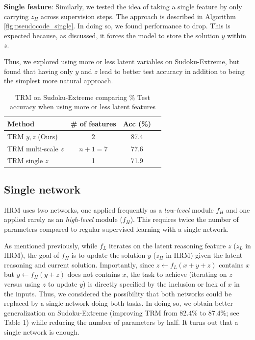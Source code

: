 \documentclass{article}
\theoremstyle{plain}
\theoremstyle{definition}
\theoremstyle{remark}
\begin{document}
\textbf{Single feature}: Similarly, we tested the idea of taking a single feature by only carrying $z_H$ across supervision steps. The approach is described in Algorithm \ref{fig:pseudocode_single}. In doing so, we found performance to drop. This is expected because, as discussed, it forces the model to store the solution $y$ within $z$.

Thus, we explored using more or less latent variables on Sudoku-Extreme, but found that having only $y$ and $z$ lead to better test accuracy in addition to being the simplest more natural approach.

\begin{table}[ht]
    \caption{TRM on Sudoku-Extreme comparing \% Test accuracy when using more or less latent features}
    \centering
    \begin{tabular}{|l|c|c|c|}
    \hline
     Method & \# of features & Acc (\%) \\
    \hline
TRM $y,z$ (Ours) & 2 & 87.4 \\
TRM multi-scale $z$ & $n+1=7$ & 77.6 \\
TRM single $z$ & 1 & 71.9 \\
\hline
\end{tabular}
\label{tab:ablation2}
\end{table}

\subsection{Single network}

HRM uses two networks, one applied frequently as a \emph{low-level} module $f_H$ and one applied rarely as an \emph{high-level} module ($f_H$). This requires twice the number of parameters compared to regular supervised learning with a single network. 

As mentioned previously, while $f_L$ iterates on the latent reasoning feature $z$ ($z_L$ in HRM), the goal of $f_H$ is to update the solution $y$ ($z_H$ in HRM) given the latent reasoning and current solution. Importantly, since $z\gets f_L(x+y+z)$ contains $x$ but $y\gets f_H(y+z)$ does not contains $x$, the task to achieve (iterating on $z$ versus using $z$ to update $y$) is directly specified by the inclusion or lack of $x$ in the inputs. Thus, we considered the possibility that both networks could be replaced by a single network doing both tasks. In doing so, we obtain better generalization on Sudoku-Extreme (improving TRM from 82.4\% to 87.4\%; see Table 1) while reducing the number of parameters by half. It turns out that a single network is enough.
\end{document}
